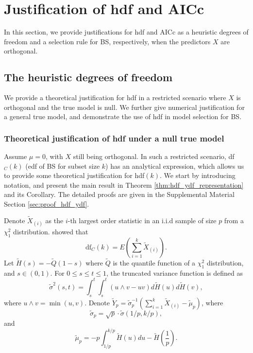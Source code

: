 \section{Justification of hdf and AICc}
\label{sec:justification_aicc_hdf}

In this section, we provide justifications for hdf and AICc as a heuristic degrees of freedom and a selection rule for BS, respectively, when the predictors $X$ are orthogonal.

\subsection{The heuristic degrees of freedom}
\label{sec:justification_hdf}

We provide a theoretical justification for hdf in a restricted scenario where $X$ is orthogonal and the true model is null. We further give numerical justification for a general true model, and demonstrate the use of hdf in model selection for BS. 

\subsubsection{Theoretical justification of hdf under a null true model}
Assume $\mu=0$, with $X$ still being orthogonal. In such a restricted scenario, df$_C(k)$ (edf of BS for subset size $k$) has an analytical expression, which allows us to provide some theoretical justification for hdf$(k)$. We start by introducing notation, and present the main result in Theorem \ref{thm:hdf_ydf_representation} and its Corollary. The detailed proofs are given in the Supplemental Material Section \ref{sec:proof_hdf_ydf}.

Denote $\tilde{X}_{(i)}$ as the $i$-th largest order statistic in an i.i.d sample of size $p$ from a $\chi^2_1$ distribution. \citet{Ye1998} showed that
\begin{equation*}
\text{df}_C(k) = E\left( \sum_{i=1}^{k} \tilde{X}_{(i)} \right).
\end{equation*}
Let $\tilde{H}(s) = -\tilde{Q}(1-s)$ where $\tilde{Q}$ is the quantile function of a $\chi_1^2$ distribution, and $s\in (0,1)$. For $0\le s \le t \le 1$, the truncated variance function is defined as
\begin{equation*}
\tilde{\sigma}^2(s,t) = \int_{s}^{t} \int_{s}^{t} (u \wedge v -uv) d \tilde{H}(u) d \tilde{H}(v),
\end{equation*}
where $u \wedge v =\min(u,v)$. Denote $\tilde{Y}_p = \tilde{\sigma}_p^{-1}(\sum_{i=1}^k \tilde{X}_{(i)} - \tilde{\mu}_p)$, where
\begin{equation*}
\tilde{\sigma}_p = \sqrt{p} \cdot \tilde{\sigma}(1/p,k/p),
\end{equation*}
and
\begin{equation*}
\tilde{\mu}_p = -p \int_{1/p}^{k/p} \tilde{H}(u) du - \tilde{H}\left(\frac{1}{p}\right).
\end{equation*}

